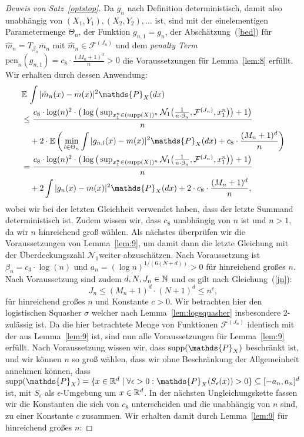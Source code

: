 \begin{proof}[Beweis von Satz~\ref{optstop}]
Da $g_n$ nach Definition deterministisch, damit also unabhängig von $(X_1, Y_1), (X_2, Y_2),\dots$ ist, sind mit der einelementigen Parametermenge $\Theta_n$, der Funktion $g_{n,1} = g_n$, der Abschätzung~(\ref{bed}) für $\hat{m}_n = T_{\beta_n}\bar{m}_n$ mit $\hat{m}_n \in \mathcal{F}^{(J_n)}$ und dem \emph{penalty Term} $\text{pen}_n(g_{n,1}) = c_8 \cdot \frac{(M_n + 1)^d}{n} > 0$ die Voraussetzungen für Lemma~\ref{lem:8} erfüllt. Wir erhalten durch dessen Anwendung:
\begin{equation*}
\begin{split}
& \E \int |\hat{m}_n(x) - m(x)|^2 \mathds{P}_X(dx) \\
& \leq \frac{c_8 \cdot \log(n)^2 \cdot \big(\log\big(\sup_{x_1^n \in (\supp(X))^n}\mathcal{N}_1\big(\frac{1}{n \cdot \beta_n},\mathcal{F}^{(J_n)},x_1^n\big)\big) + 1\big)}{n} \\
& \quad + 2 \cdot \E\bigg(\min_{l \in \Theta_n} \int |g_{n,l}(x) - m(x)|^2 \mathds{P}_X(dx) + c_8 \cdot \frac{(M_n + 1)^d}{n}\bigg) \\
& = \frac{c_8 \cdot \log(n)^2 \cdot \big(\log\big(\sup_{x_1^n \in (\supp(X))^n}\mathcal{N}_1\big(\frac{1}{n \cdot \beta_n},\mathcal{F}^{(J_n)},x_1^n\big)\big) + 1\big)}{n} \\
& \quad + 2 \int |g_{n}(x) - m(x)|^2 \mathds{P}_X(dx) + 2 \cdot c_8 \cdot \frac{(M_n + 1)^d}{n},
\end{split}
\end{equation*}
wobei wir bei der letzten Gleichheit verwendet haben, dass der letzte Summand deterministisch ist. Zudem wissen wir, dass $c_8$ unabhängig von $n$ ist und $n > 1$, da wir $n$ hinreichend groß wählen.
Als nächstes überprüfen wir die Voraussetzungen von Lemma~\ref{lem:9}, um damit dann die letzte Gleichung mit der Überdeckungszahl $\mathcal{N}_1$weiter abzuschätzen.
Nach Voraussetzung ist $\beta_n = c_3 \cdot \log(n)$ und $a_n = (\log n)^{1/(6(N + d))} > 0$ für hinreichend großes $n$. Nach Voraussetzung sind zudem $d, N, J_n \in \mathbb{N}$ und es gilt nach Gleichung~(\ref{jn}): 
$$J_n \leq (M_n + 1)^d \cdot (N + 1)^d \leq n^{c},$$
für hinreichend großes $n$ und Konstante $c > 0$. Wir betrachten hier den logistischen Squasher $\sigma$ welcher nach Lemma~\ref{lem:logsquasher} insbesondere 2-zulässig ist. Da die hier betrachtete Menge von Funktionen $\mathcal{F}^{(J_n)}$ identisch mit der aus Lemma~\ref{lem:9} ist, sind nun alle Voraussetzungen für Lemma~\ref{lem:9} erfüllt. Nach Voraussetzung wissen wir, dass $\supp(\mathds{P}_X)$ beschränkt ist, und wir können $n$ so groß wählen, dass wir ohne Beschränkung der Allgemeinheit annehmen können, dass $\supp(\mathds{P}_X) = \{x \in \R^d \mid \forall \epsilon > 0 : \mathds{P}_X(S_{\epsilon}(x)) > 0\} \subseteq [-a_n, a_n]^d$ ist, mit $S_{\epsilon}$ als $\epsilon$-Umgebung um $x \in \mathbb{R}^d$. In der nächsten Ungleichungskette fassen wir die Konstanten die sich von $c_8$ unterscheiden und die unabhängig von $n$ sind, zu einer Konstante $c$ zusammen. Wir erhalten damit durch Lemma~\ref{lem:9} für hinreichend großes $n$:

\end{proof}
